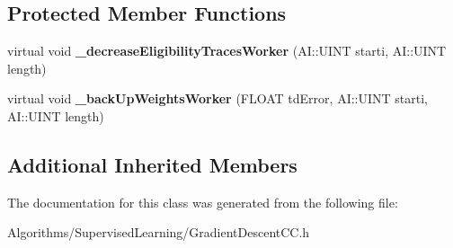 \subsection*{Protected Member Functions}
\begin{DoxyCompactItemize}
\item 
\hypertarget{classAI_1_1Algorithm_1_1GradientDescentCC_a671233415fd282b198c6d0999e63832a}{virtual void {\bfseries \-\_\-decrease\-Eligibility\-Traces\-Worker} (A\-I\-::\-U\-I\-N\-T starti, A\-I\-::\-U\-I\-N\-T length)}\label{classAI_1_1Algorithm_1_1GradientDescentCC_a671233415fd282b198c6d0999e63832a}

\item 
\hypertarget{classAI_1_1Algorithm_1_1GradientDescentCC_a647a9d1f60731c366695a7c1fac008d4}{virtual void {\bfseries \-\_\-back\-Up\-Weights\-Worker} (F\-L\-O\-A\-T td\-Error, A\-I\-::\-U\-I\-N\-T starti, A\-I\-::\-U\-I\-N\-T length)}\label{classAI_1_1Algorithm_1_1GradientDescentCC_a647a9d1f60731c366695a7c1fac008d4}

\end{DoxyCompactItemize}
\subsection*{Additional Inherited Members}


The documentation for this class was generated from the following file\-:\begin{DoxyCompactItemize}
\item 
Algorithms/\-Supervised\-Learning/Gradient\-Descent\-C\-C.\-h\end{DoxyCompactItemize}
